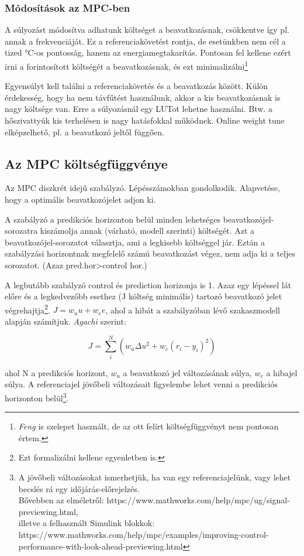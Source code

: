 \subsubsection{Módosítások az MPC-ben}

A súlyozást módosítva adhatunk költséget a beavatkozásnak, csökkentve így pl. annak a frekvenciáját. Ez a referenciakövetést rontja, de esetünkben nem cél a tized \si{\celsius}-os pontosság, hanem az energiamegtakarítás.
Pontosan fel kellene ezért írni a forintosított költségét a beavatkozásnak, és ezt minimalizálni\footnote{\textit{Feng \cite{FENG2015199}} is szelepet használt, de az ott felírt költségfüggvényt nem pontosan értem.}

Egyensúlyt kell találni a referenciakövetés és a beavatkozás között. Külön érdekesség, hogy ha nem távfűtést használunk, akkor a kis beavatkozásnak is nagy költsége van. Erre a súlyozásnál egy LUTot lehetne használni. Btw. a hőszivattyúk kis terhelésen is nagy hatásfokkal működnek. Online weight tune elképzelhető, pl. a beavatkozó jeltől függően.

\subsection{Az MPC költségfüggvénye}

Az MPC diszkrét idejű szabályzó. Lépésszámokban gondolkodik. Alapvetése, hogy a  optimális beavatkozójelet adjon ki.

A szabályzó a predikciós horizonton belül minden lehetséges beavatkozójel-sorozatra kiszámolja annak (várható, modell szerinti) költségét. Azt a beavatkozójel-sorozatot választja, ami a legkisebb költséggel jár. Eztán a szabályzási horizontnak megfelelő számú beavatkozást végez, nem adja ki a teljes sorozatot. (Azaz pred.hor>control hor.)

A legbutább szabályzó control és prediction horizonja is 1. Azaz egy lépéssel lát előre és a legkedvezőbb esethez (J költség minimális) tartozó beavatkozó jelet végrehajtja\footnote{Ezt formalizálni kellene egyenletben is.}. $J=w_u u + w_e e$, ahol a hibát a szabályzóban lévő szakaszmodell alapján számítjuk. \textit{Agachi \cite{romanMPC_Agachi}} szerint:%

\begin{equation} \label{eq_mpc_cost}
J = \sum_{i}^{N} \left(w_u \Delta u^2 + w_e (r_i-y_i)^2  \right)
\end{equation}

ahol N a predikciós horizont, $w_u$ a beavatkozó jel változásának súlya, $w_e$ a hibajel súlya. A referenciajel jövőbeli változásait figyelembe lehet venni a predikciós horizonton belül\footnote{A jövőbeli változásokat ismerhetjük, ha van egy referenciajelünk, vagy lehet becslés rá egy időjárás-előrejelzés.\\Bővebben az elméletről: https://www.mathworks.com/help/mpc/ug/signal-previewing.html,\\illetve a felhasznált Simulink blokkok: https://www.mathworks.com/help/mpc/examples/improving-control-performance-with-look-ahead-previewing.html}.

